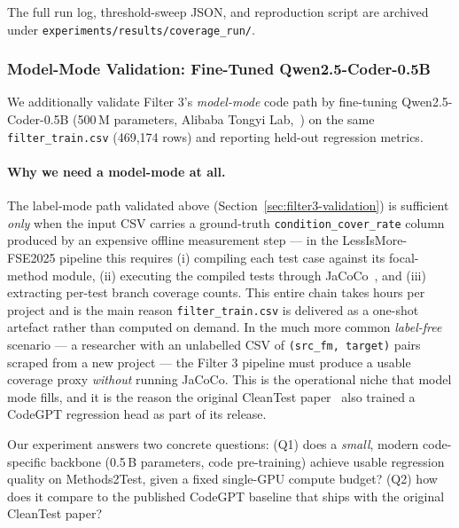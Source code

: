 \documentclass[acmlarge,nonacm,screen]{acmart}
\begin{document}
The full run log, threshold-sweep JSON, and reproduction script are
archived under \texttt{experiments/results/coverage\_run/}.

\subsubsection{Model-Mode Validation: Fine-Tuned Qwen2.5-Coder-0.5B}
\label{sec:filter3-model-mode-validation}

We additionally validate Filter 3's \emph{model-mode} code path by
fine-tuning Qwen2.5-Coder-0.5B (500\,M parameters, Alibaba Tongyi
Lab,~\cite{hui2024qwen}) on the same \texttt{filter\_train.csv}
(469{,}174 rows) and reporting held-out regression metrics.

\paragraph{Why we need a model-mode at all.}
The label-mode path validated above
(Section~\ref{sec:filter3-validation}) is sufficient \emph{only}
when the input CSV carries a ground-truth
\texttt{condition\_cover\_rate} column produced by an
expensive offline measurement step --- in the LessIsMore-FSE2025
pipeline this requires (i) compiling each test case against its
focal-method module, (ii) executing the compiled tests through
JaCoCo~\cite{jacoco}, and (iii) extracting per-test branch coverage
counts. This entire chain takes hours per project and is the main
reason \texttt{filter\_train.csv} is delivered as a one-shot
artefact rather than computed on demand. In the much more common
\emph{label-free} scenario --- a researcher with an unlabelled CSV
of \texttt{(src\_fm, target)} pairs scraped from a new project ---
the Filter 3 pipeline must produce a usable coverage proxy
\emph{without} running JaCoCo. This is the operational niche that
model mode fills, and it is the reason the original CleanTest
paper~\cite{zhang2025cleantest} also trained a CodeGPT regression
head as part of its release.

Our experiment answers two concrete questions:
(Q1) does a \emph{small}, modern code-specific backbone
(0.5\,B parameters, code pre-training) achieve usable regression
quality on Methods2Test, given a fixed single-GPU compute budget?
(Q2) how does it compare to the published CodeGPT baseline that
ships with the original CleanTest paper?
\end{document}
